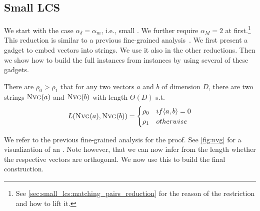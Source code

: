 

\subsection{Small LCS}
We start with the case $\alpha_\delta = \alpha_m$, i.e., small \lcs{}.
We further require $\alpha_M = 2$ at first.\footnote{See \autoref{sec:small_lcs:matching_pairs_reduction} for the reason of the restriction and how to lift it.} %
This reduction is similar to a previous fine-grained analysis~\cite{Bringmann.2015}.
We first present a gadget to embed vectors into strings.
We use it also in the other reductions.
Then we show how to build the full \lcs{} instances from \ov{} instances by using several of these gadgets.



\begin{theorem}
\label{thm:nvg}
There are $\rho_0 > \rho_1$ that for any two vectors $a$ and $b$ of dimension $D$, there are two strings $\text{\textsc{Nvg}}(a)$ and $\text{\textsc{Nvg}}(b)$ with length $\Theta(D)$ s.t.
\[
L(\text{\textsc{Nvg}}(a), \text{\textsc{Nvg}}(b)) = \begin{cases}
		\rho_0 & if \langle a, b \rangle = 0\\
		\rho_1 & otherwise
	\end{cases}
\]
\end{theorem}


We refer to the previous fine-grained analysis \cite{Bringmann.2015} for the proof.
See \autoref{fig:nvg} for a visualization of an \nvgName{}.
Note however, that we can now infer from the \lcs{} length whether the respective vectors are orthogonal.
We now use this to build the final construction.


